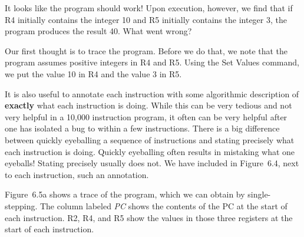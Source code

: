 \documentclass{patt}
\begin{document}
It looks like the program should work!  Upon execution, however, we find that 
if R4 initially contains the integer 10 and R5 initially contains the 
integer 3, the program produces the result 40.  What went wrong?

Our first thought is to trace the program.  Before we do that, we note
that the program assumes positive integers in R4 and R5.  Using the
Set Values command, we put the value 10 in R4 and the value 3
in R5.

It is also useful to annotate each instruction with some algorithmic
description of {\bf exactly} what each instruction is doing.  While
this can be very tedious and not very helpful in a 10,000 instruction
program, it often can be very helpful after one has isolated a bug to
within a few instructions.  There is a big difference between quickly
eyeballing a sequence of instructions and stating precisely what each
instruction is doing.  Quickly eyeballing often results in mistaking
what one eyeballs!  Stating precisely usually does not.  We have included 
in Figure~6.4, next to each instruction, such an annotation.

\FloatBarrier
Figure~6.5a shows a trace of the program, which we can obtain by
single-stepping. The column labeled {\em PC} shows the contents of
the PC at the start of each instruction.  R2, R4, and R5 show the
values in those three registers at the start of each instruction.
\end{document}
